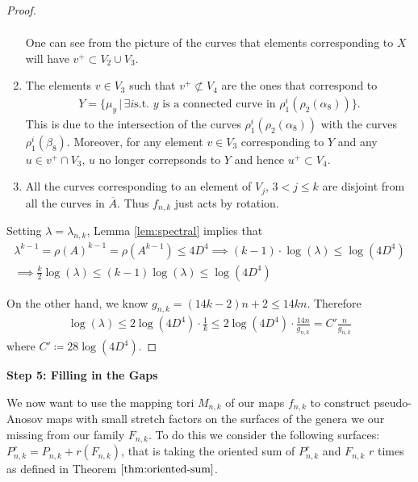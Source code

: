 \begin{proof}
\begin{enumerate}
\begin{align*}
    \end{align*}
    One can see from the picture of the curves that elements corresponding to $X$ will have $v^+ \subset V_2 \cup V_3$.
    \item The elements $v \in V_3$ such that $v^+ \not\subset V_4$ are the ones that correspond to
    \begin{align*}
        Y = \{\mu_y \,\vert\, \exists i \text{s.t. $y$ is a connected curve in } \rho_1^i(\rho_2(\alpha_8))\}.
    \end{align*}
    This is due to the intersection of the curves $\rho_1^i(\rho_2(\alpha_8))$ with the curves $\rho_1^i(\beta_8)$. Moreover, for any element $v \in V_3$ corresponding to $Y$ and any $u \in v^+ \cap V_3$, $u$ no longer correpsonds to $Y$ and hence $u^+ \subset V_4$.
    \item All the curves corresponding to an element of $V_j$, $3 < j \leq k$ are disjoint from all the curves in $\overline{A}$. Thus $f_{n,k}$ just acts by rotation.
\end{enumerate}

Setting $\lambda = \lambda_{n,k}$, Lemma \ref{lem:spectral} implies that
\begin{gather*}
    \lambda^{k-1} = \rho(A)^{k-1} = \rho(A^{k-1}) \leq 4D^4 \implies (k-1)\cdot \log(\lambda) \leq \log(4D^4) \\
    \implies \frac{k}{2}\log(\lambda) \leq (k-1)\log(\lambda) \leq \log(4D^4)
\end{gather*}

On the other hand, we know $g_{n,k} = (14k - 2)n + 2 \leq 14kn$. Therefore
\begin{align*}
    \log(\lambda) \leq 2\log(4D^4)\cdot\frac{1}{k} \leq 2\log(4D^4)\cdot \frac{14n}{g_{n,k}} = C'\frac{n}{g_{n,k}}
\end{align*}
where $C' \coloneqq 28\log(4D^4)$.
\end{proof}

\begin{center}
\textbf{Step 5: Filling in the Gaps}
\end{center}

We now want to use the mapping tori $M_{n,k}$ of our maps $f_{n,k}$ to construct pseudo-Anosov maps with small stretch factors on the surfaces of the genera we our missing from our family $F_{n,k}$. To do this we consider the following surfaces: $P^r_{n,k} = P_{n,k} + r(F_{n,k})$, that is taking the oriented sum of $P^r_{n,k}$ and $F_{n,k}$ $r$ times as defined in Theorem $\ref{thm:oriented-sum}$.

